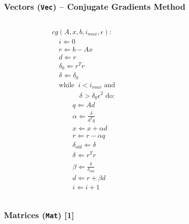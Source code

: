 \documentclass{beamer}
\begin{document}
\begin{frame}
  \frametitle{Vectors (\texttt{Vec}) -- Conjugate Gradients Method}
  \begin{columns}[t]
    \begin{column}{.45\textwidth}
      \tiny
      \begin{equation*}
        \begin{split}
          & cg(A,x,b,i_{max},\epsilon): \\
          & \quad i \Leftarrow 0 \\
          & \quad r \Leftarrow b - A x \\
          & \quad d \Leftarrow r \\
          & \quad \delta_{0} \Leftarrow r^T r \\
          & \quad \delta_{   } \Leftarrow \delta_{0} \\
          & \quad \text{while}\;\; i < i_{max} \text{ and } \\
          & \quad\quad\qquad  \delta_{   } > \delta_{0} \epsilon^2 \text{ do} :\\
          & \quad\quad\quad  q \Leftarrow Ad \\
          & \quad\quad\quad  \alpha \Leftarrow \frac{\delta_{   }}{d^T q} \\
          & \quad\quad\quad  x \Leftarrow x + \alpha d\\
          & \quad\quad\quad  r \Leftarrow r - \alpha q\\
          & \quad\quad\quad  \delta_{old} \Leftarrow \delta_{   } \\
          & \quad\quad\quad  \delta_{   } \Leftarrow r^T r \\
          & \quad\quad\quad  \beta \Leftarrow \frac{\delta_{   }}{\delta_{old}} \\
          & \quad\quad\quad  d \Leftarrow r + \beta d\\
          & \quad\quad\quad  i \Leftarrow i + 1
        \end{split}
      \end{equation*}
    \end{column}
    \begin{column}{.45\textwidth}
      \tiny\inputminted[linenos]{python}{petsc4py_vec.py}
    \end{column}
  \end{columns}
\end{frame}

\begin{frame}
  \frametitle{Matrices (\texttt{Mat}) [1]}
  \small\inputminted[linenos]{python}{petsc4py_mat_1.py}
\end{frame}
\end{document}
